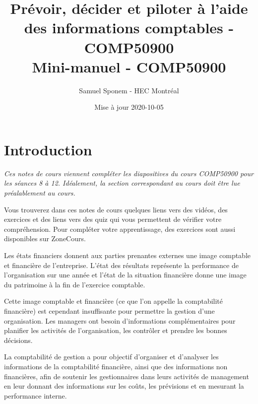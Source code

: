 \documentclass[oneside]{kaobook}
\author{Samuel Sponem - HEC Montréal}
\date{Mise à jour 2020-10-05}
\title{Prévoir, décider et piloter à l'aide des informations comptables - COMP50900\\\medskip
\large Mini-manuel - COMP50900}
\begin{document}

\maketitle
\setcounter{tocdepth}{1}
\tableofcontents

\mainmatter
{}
\setchapterpreamble[u]{\margintoc}

\chapter{Introduction}
\label{sec:org9f70db8}

\begin{kaobox}
\emph{Ces notes de cours viennent compléter les diapositives du cours COMP50900 pour les séances 8 à 12. Idéalement, la section correspondant au cours doit être lue préalablement au cours.}

Vous trouverez dans ces notes de cours quelques liens vers des vidéos, des exercices et des liens vers des quiz qui vous permettent de vérifier votre compréhension. Pour compléter votre apprentissage, des exercices sont aussi disponibles sur ZoneCours.
\end{kaobox}

Les états financiers donnent aux parties prenantes externes une image comptable et financière de l'entreprise. L'état des résultats représente la performance de l'organisation sur une année et l'état de la situation financière donne une image du patrimoine à la fin de l'exercice comptable.

Cette image comptable et financière (ce que l'on appelle la comptabilité financière) est cependant insuffisante pour permettre la gestion d'une organisation. Les managers ont besoin d'informations complémentaires pour planifier les activités de l'organisation, les contrôler et prendre les bonnes décisions.

La comptabilité de gestion a pour objectif d'organiser et d'analyser les informations de la comptabilité financière, ainsi que des informations non financières, afin de soutenir les gestionnaires dans leurs activités de management en leur donnant des informations sur les coûts, les prévisions et en mesurant la performance interne.
\end{document}
